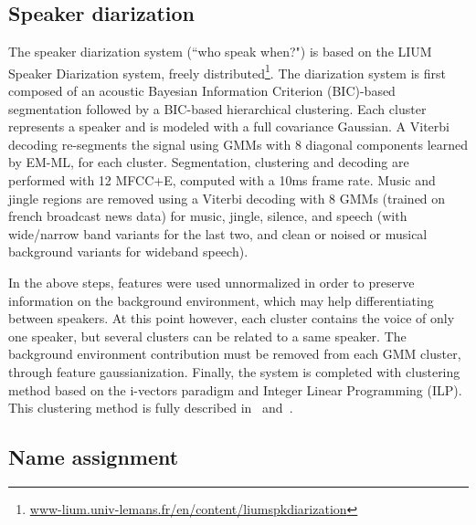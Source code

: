 \subsection{Speaker diarization}

The speaker diarization system (``who speak when?") is based on the LIUM Speaker Diarization system\cite{rouvier2013}, freely distributed\footnote{\url{www-lium.univ-lemans.fr/en/content/liumspkdiarization}}. 
%
The diarization system is first composed of an acoustic Bayesian Information Criterion (BIC)-based segmentation followed by a BIC-based hierarchical clustering. Each cluster represents a speaker and is modeled with a full covariance Gaussian. A Viterbi decoding re-segments the signal using GMMs with 8 diagonal components learned by EM-ML, for each cluster. Segmentation, clustering and decoding are performed with 12 MFCC+E, computed with a 10ms frame rate. Music and jingle regions are removed using a Viterbi decoding with 8 GMMs (trained on french broadcast news data) for music, jingle, silence, and speech (with wide/narrow band variants for the last two, and clean or noised or musical background variants for wideband speech).

In the above steps, features were used unnormalized in order to preserve information on the background environment, which may help differentiating between speakers. At this point however, each cluster contains the voice of only one speaker, but several clusters can be related to a same speaker. The background environment contribution must be removed from each GMM cluster, through feature gaussianization.
%
Finally, the system is completed with clustering method based on the i-vectors paradigm and Integer Linear Programming (ILP). 
This clustering method is fully described in~\cite{rouvier12-2} and~\cite{dupuy2014}. 

\subsection{Name assignment}

